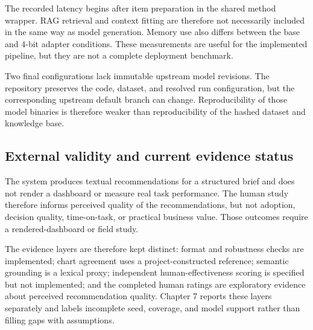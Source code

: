 The recorded latency begins after item preparation in the shared method wrapper. RAG retrieval and context fitting are therefore not necessarily included in the same way as model generation. Memory use also differs between the base and 4-bit adapter conditions. These measurements are useful for the implemented pipeline, but they are not a complete deployment benchmark.

Two final configurations lack immutable upstream model revisions. The repository preserves the code, dataset, and resolved run configuration, but the corresponding upstream default branch can change. Reproducibility of those model binaries is therefore weaker than reproducibility of the hashed dataset and knowledge base.

\subsection{External validity and current evidence status}

The system produces textual recommendations for a structured brief and does not render a dashboard or measure real task performance. The human study therefore informs perceived quality of the recommendations, but not adoption, decision quality, time-on-task, or practical business value. Those outcomes require a rendered-dashboard or field study.

The evidence layers are therefore kept distinct: format and robustness checks are implemented; chart agreement uses a project-constructed reference; semantic grounding is a lexical proxy; independent human-effectiveness scoring is specified but not implemented; and the completed human ratings are exploratory evidence about perceived recommendation quality. Chapter 7 reports these layers separately and labels incomplete seed, coverage, and model support rather than filling gaps with assumptions.
